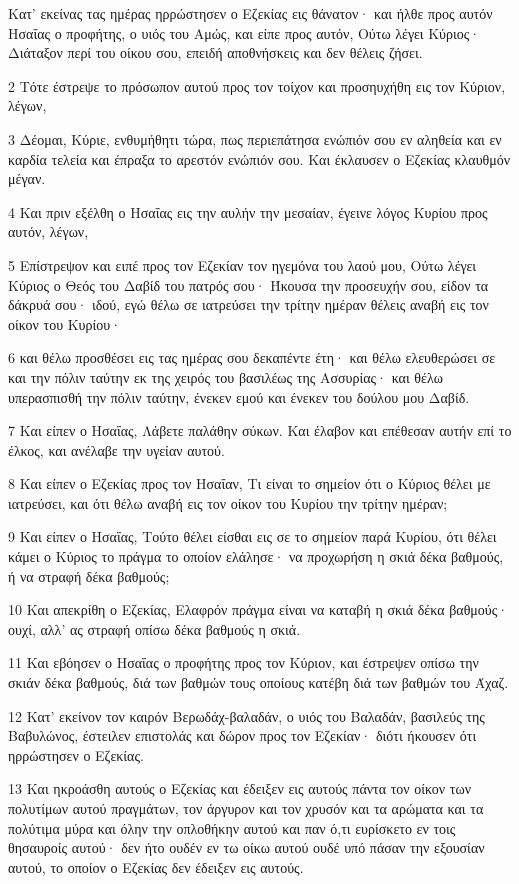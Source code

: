 \par Κατ' εκείνας τας ημέρας ηρρώστησεν ο Εζεκίας εις θάνατον· και ήλθε προς αυτόν Ησαΐας ο προφήτης, ο υιός του Αμώς, και είπε προς αυτόν, Ούτω λέγει Κύριος· Διάταξον περί του οίκου σου, επειδή αποθνήσκεις και δεν θέλεις ζήσει.
\par 2 Τότε έστρεψε το πρόσωπον αυτού προς τον τοίχον και προσηυχήθη εις τον Κύριον, λέγων,
\par 3 Δέομαι, Κύριε, ενθυμήθητι τώρα, πως περιεπάτησα ενώπιόν σου εν αληθεία και εν καρδία τελεία και έπραξα το αρεστόν ενώπιόν σου. Και έκλαυσεν ο Εζεκίας κλαυθμόν μέγαν.
\par 4 Και πριν εξέλθη ο Ησαΐας εις την αυλήν την μεσαίαν, έγεινε λόγος Κυρίου προς αυτόν, λέγων,
\par 5 Επίστρεψον και ειπέ προς τον Εζεκίαν τον ηγεμόνα του λαού μου, Ούτω λέγει Κύριος ο Θεός του Δαβίδ του πατρός σου· Ήκουσα την προσευχήν σου, είδον τα δάκρυά σου· ιδού, εγώ θέλω σε ιατρεύσει την τρίτην ημέραν θέλεις αναβή εις τον οίκον του Κυρίου·
\par 6 και θέλω προσθέσει εις τας ημέρας σου δεκαπέντε έτη· και θέλω ελευθερώσει σε και την πόλιν ταύτην εκ της χειρός του βασιλέως της Ασσυρίας· και θέλω υπερασπισθή την πόλιν ταύτην, ένεκεν εμού και ένεκεν του δούλου μου Δαβίδ.
\par 7 Και είπεν ο Ησαΐας, Λάβετε παλάθην σύκων. Και έλαβον και επέθεσαν αυτήν επί το έλκος, και ανέλαβε την υγείαν αυτού.
\par 8 Και είπεν ο Εζεκίας προς τον Ησαΐαν, Τι είναι το σημείον ότι ο Κύριος θέλει με ιατρεύσει, και ότι θέλω αναβή εις τον οίκον του Κυρίου την τρίτην ημέραν;
\par 9 Και είπεν ο Ησαΐας, Τούτο θέλει είσθαι εις σε το σημείον παρά Κυρίου, ότι θέλει κάμει ο Κύριος το πράγμα το οποίον ελάλησε· να προχωρήση η σκιά δέκα βαθμούς, ή να στραφή δέκα βαθμούς;
\par 10 Και απεκρίθη ο Εζεκίας, Ελαφρόν πράγμα είναι να καταβή η σκιά δέκα βαθμούς· ουχί, αλλ' ας στραφή οπίσω δέκα βαθμούς η σκιά.
\par 11 Και εβόησεν ο Ησαΐας ο προφήτης προς τον Κύριον, και έστρεψεν οπίσω την σκιάν δέκα βαθμούς, διά των βαθμών τους οποίους κατέβη διά των βαθμών του Άχαζ.
\par 12 Κατ' εκείνον τον καιρόν Βερωδάχ-βαλαδάν, ο υιός του Βαλαδάν, βασιλεύς της Βαβυλώνος, έστειλεν επιστολάς και δώρον προς τον Εζεκίαν· διότι ήκουσεν ότι ηρρώστησεν ο Εζεκίας.
\par 13 Και ηκροάσθη αυτούς ο Εζεκίας και έδειξεν εις αυτούς πάντα τον οίκον των πολυτίμων αυτού πραγμάτων, τον άργυρον και τον χρυσόν και τα αρώματα και τα πολύτιμα μύρα και όλην την οπλοθήκην αυτού και παν ό,τι ευρίσκετο εν τοις θησαυροίς αυτού· δεν ήτο ουδέν εν τω οίκω αυτού ουδέ υπό πάσαν την εξουσίαν αυτού, το οποίον ο Εζεκίας δεν έδειξεν εις αυτούς.
